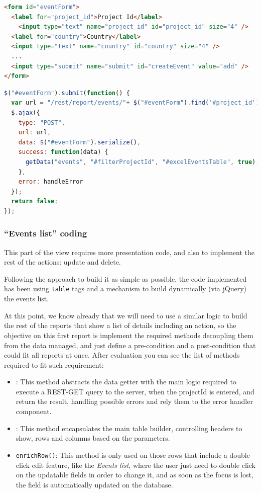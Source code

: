 \begin{lstlisting}[language=HTML,breaklines=true,caption=Add\ new\ Event\
HTML\ code,label=f_migration_addnewevent_html]
<form id="eventForm">
  <label for="project_id">Project Id</label>
    <input type="text" name="project_id" id="project_id" size="4" />
  <label for="country">Country</label>
  <input type="text" name="country" id="country" size="4" /> 
  ...
  <input type="submit" name="submit" id="createEvent" value="add" />
</form>
\end{lstlisting}

\begin{lstlisting}[language=Javascript,breaklines=true,caption=Add\ new\ Event\
jQuery\ code,label=f_migration_addnewevent_jquery] 
$("#eventForm").submit(function() { 
  var url = "/rest/report/events/"+ $("#eventForm").find('#project_id').val();
  $.ajax({ 
    type: "POST", 
    url: url, 
    data: $("#eventForm").serialize(),
    success: function(data) {
      getData("events", "#filterProjectId", "#excelEventsTable", true);
    },
    error: handleError
  });
  return false;
});
\end{lstlisting}

\subsubsection{``Events list'' coding}
\label{sec:eventlist}

This part of the view requires more presentation code, and also to
implement the rest of the actions: update and delete.

Following the approach to build it as simple as possible, the code implemented
has been using \texttt{table} tags and a mechanism to build dynamically (via
jQuery) the events list. 

At this point, we know already that we will need to use a similar logic to build
the rest of the reports that show a list of details including an action, so the
objective on this first report is implement the required methods decoupling them
from the data managed, and just define a pre-condition and a post-condition that
could fit all reports at once. After evaluation you can see the list of methods
required to fit such requirement:

\begin{itemize}
  \item {}: This method abstracts the data getter with the main
  logic required to execute a REST-GET query to the server, when the projectId
  is entered, and return the result, handling possible errors and rely them to
  the error handler component.
  \item \textt{buildTable()}: This method encapsulates the main table builder,
  controlling headers to show, rows and columns based on the parameters.
  \item \texttt{enrichRow()}: This method is only used on those rows that
  include a double-click edit feature, like the \emph{Events list}, where the
  user just need to double click on the updatable fields in order to change
  it, and as soon as the focus is lost, the field is automatically updated on
  the database.
\end{itemize}

